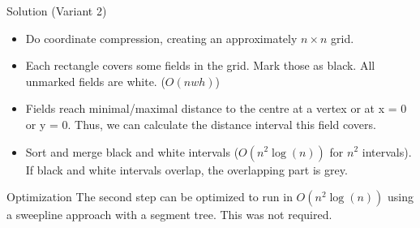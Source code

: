 \begin{slide}
	\begin{block}{Solution (Variant 2)}
		\begin{itemize}
			\item Do coordinate compression, creating an approximately $n \times n$ grid.
			\item Each rectangle covers some fields in the grid. Mark those as black. All unmarked fields are white. ($O(nwh)$)
			\item Fields reach minimal/maximal distance to the centre at a vertex or at x = 0 or y = 0. Thus, we can calculate the distance interval this field covers.
			\item Sort and merge black and white intervals ($O(n^2 \log(n))$ for $n^2$ intervals). If black and white intervals overlap, the overlapping part is grey.
		\end{itemize}
	\end{block}
	\pause
	\begin{block}{Optimization}
		The second step can be optimized to run in $O(n^2 \log(n))$ using a sweepline approach with a segment tree. This was not required.
	\end{block}
\end{slide} 
